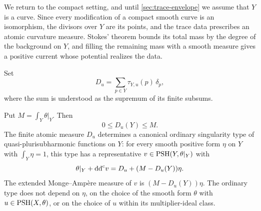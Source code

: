 We return to the compact setting, and until \cref{sec:trace-envelope} we assume that $Y$ is a curve. Since every modification of a compact smooth curve is an isomorphism, the divisors over $Y$ are its points, and the trace data prescribes an atomic curvature measure. Stokes' theorem bounds its total mass by the degree of the background on $Y$, and filling the remaining mass with a smooth measure gives a positive current whose potential realizes the data.

Set
\[
 D_u=\sum_{p\in Y}\tau_{Y,u}(p)\,\delta_p,
\]
where the sum is understood as the supremum of its finite subsums.

\begin{theorem}\label{thm:curve-trace-realization}
Put $M=\int_Y\theta|_Y$. Then
\begin{equation}\label{eq:curve-trace-budget}
 0\leq D_u(Y)\leq M.
\end{equation}
The finite atomic measure $D_u$ determines a canonical ordinary singularity type of quasi-plurisubharmonic functions on $Y$: for every smooth positive form $\eta$ on $Y$ with $\int_Y\eta=1$, this type has a representative $v\in\mathrm{PSH}(Y,\theta|_Y)$ with
\begin{equation}\label{eq:curve-trace-current}
 \theta|_Y+\mathrm{dd}^{\mathrm{c}} v=D_u+(M-D_u(Y))\eta.
\end{equation}
The extended Monge--Amp\`ere measure of $v$ is $(M-D_u(Y))\eta$. The ordinary type does not depend on $\eta$, on the choice of the smooth form $\theta$ with $u\in\mathrm{PSH}(X,\theta)$, or on the choice of $u$ within its multiplier-ideal class.
\end{theorem}
